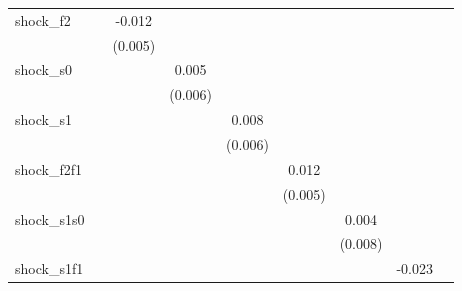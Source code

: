 {\begin{tabular}{l*{8}{c}}
\addlinespace
shock\_f2    &                     &      -0.012\sym{**} &                     &                     &                     &                     &                     &                     \\
            &                     &     (0.005)         &                     &                     &                     &                     &                     &                     \\
\addlinespace
shock\_s0    &                     &                     &       0.005         &                     &                     &                     &                     &                     \\
            &                     &                     &     (0.006)         &                     &                     &                     &                     &                     \\
\addlinespace
shock\_s1    &                     &                     &                     &       0.008         &                     &                     &                     &                     \\
            &                     &                     &                     &     (0.006)         &                     &                     &                     &                     \\
\addlinespace
shock\_f2f1  &                     &                     &                     &                     &       0.012\sym{**} &                     &                     &                     \\
            &                     &                     &                     &                     &     (0.005)         &                     &                     &                     \\
\addlinespace
shock\_s1s0  &                     &                     &                     &                     &                     &       0.004         &                     &                     \\
            &                     &                     &                     &                     &                     &     (0.008)         &                     &                     \\
\addlinespace
shock\_s1f1  &                     &                     &                     &                     &                     &                     &      -0.023\sym{**} &                     \\

\end{tabular}}

